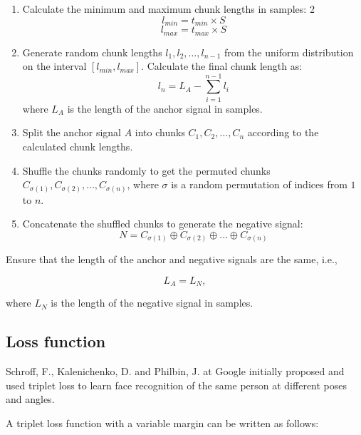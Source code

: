 \begin{enumerate}
\item Calculate the minimum and maximum chunk lengths in samples:
2\begin{equation}
l_{min} = t_{min} \times S
\end{equation}
\begin{equation}
l_{max} = t_{max} \times S
\end{equation}
\item Generate random chunk lengths $l_1, l_2, \ldots, l_{n-1}$ from the uniform distribution on the interval $[l_{min}, l_{max}]$. Calculate the final chunk length as:
\begin{equation}
l_n = L_A - \sum_{i=1}^{n-1} l_i
\end{equation}
where $L_A$ is the length of the anchor signal in samples.
\item Split the anchor signal $A$ into chunks $C_1, C_2, \ldots, C_n$ according to the calculated chunk lengths.
\item Shuffle the chunks randomly to get the permuted chunks $C_{\sigma(1)}, C_{\sigma(2)}, \ldots, C_{\sigma(n)}$, where $\sigma$ is a random permutation of indices from $1$ to $n$.
\item Concatenate the shuffled chunks to generate the negative signal:
\begin{equation}\label{eq:negative_signal}
N = C_{\sigma(1)} \oplus C_{\sigma(2)} \oplus \ldots \oplus C_{\sigma(n)}
\end{equation}
\end{enumerate}

Ensure that the length of the anchor and negative signals are the same, i.e.,

\begin{equation}
L_A = L_N,
\end{equation}

where $L_N$ is the length of the negative signal in samples.

\subsection{Loss function}

Schroff, F., Kalenichenko, D. and Philbin, J. at Google initially proposed and used triplet loss to learn face recognition of the same person at different poses and angles. \cite{Schroff2015FaceNet:Clustering}

A triplet loss function with a variable margin can be written as follows:


